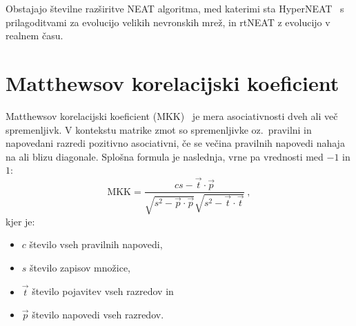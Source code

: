 \documentclass[a4paper,12pt,openright]{book}
\begin{document}
    Obstajajo številne razširitve NEAT algoritma, med katerimi sta HyperNEAT~\cite{Iba_2018} s prilagoditvami za evolucijo velikih nevronskih mrež,
    in rtNEAT z evolucijo v realnem času.


    \section{Matthewsov korelacijski koeficient}\label{sec:mkk}
    Matthewsov korelacijski koeficient (MKK)~\cite{mcc_wiki} je mera asociativnosti dveh ali več spremenljivk.
    V kontekstu matrike zmot so spremenljivke oz.\ pravilni in napovedani razredi pozitivno asociativni, če se večina pravilnih napovedi nahaja na ali blizu diagonale.
    Splošna formula je naslednja, vrne pa vrednosti med $-1$ in $1$:
    \begin{equation}
        \text{MKK}={\frac {cs-{\vec {t}}\cdot {\vec {p}}}{{\sqrt {s^{2}-{\vec {p}}\cdot {\vec {p}}}}{\sqrt {s^{2}-{\vec {t}}\cdot {\vec {t}}}}}}\:,
        \label{eq:mcc}
    \end{equation}
    kjer je:
    \begin{itemize}
        \item $c$ število vseh pravilnih napovedi,
        \item $s$ število zapisov množice,
        \item $\vec{t}$ število pojavitev vseh razredov in
        \item $\vec{p}$ število napovedi vseh razredov.
    \end{itemize}

\end{document}
